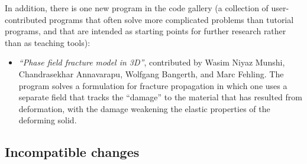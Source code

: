 \documentclass{ansarticle-preprint}
\begin{document}
In addition, there is one new program in the code gallery (a collection of
user-contributed programs that often solve more complicated problems
than tutorial programs, and that are intended as starting points for further
research rather than as teaching tools):
\begin{itemize}
  \item \emph{``Phase field fracture model in 3D''},
    contributed by Wasim Niyaz Munshi,
    Chandrasekhar Annavarapu,
    Wolfgang Bangerth, and
    Marc Fehling. The program solves a formulation for fracture
    propagation in which one uses a separate field that tracks the
    ``damage'' to the material that has resulted from deformation,
    with the damage weakening the elastic properties of the deforming solid.
\end{itemize}


\subsection{Incompatible changes}\label{subsec:deprecated}
\end{document}
